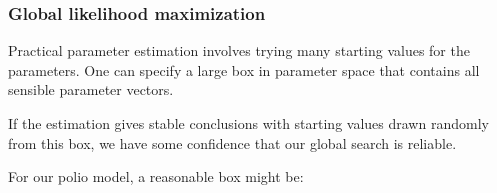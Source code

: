 \begin{frame}[fragile]

\frametitle{Global likelihood maximization}

\bi
\item 
Practical parameter estimation involves trying many starting values for the parameters. One can specify a large box in parameter space that contains all sensible parameter vectors.

\item If the estimation gives stable conclusions with starting values drawn randomly from this box, we have some confidence that our global search is reliable.

\item For our polio model, a reasonable box might be:
\ei

\begin{knitrout}\small
{}\color{fgcolor}\begin{kframe}
\begin{alltt}
 \hlkwb{<-} \hlstd{(}
  \hlstd{=}\hlstd{(}\hlopt{-}\hlstd{,}\hlstd{),} \hlstd{=}\hlstd{(}\hlopt{-}\hlstd{,}\hlstd{),}
  \hlstd{=}\hlstd{(}\hlopt{-}\hlstd{,}\hlstd{),} \hlstd{=}\hlstd{(}\hlopt{-}\hlstd{,}\hlstd{),}
  \hlstd{=}\hlstd{(}\hlopt{-}\hlstd{,}\hlstd{),} \hlstd{=}\hlstd{(}\hlopt{-}\hlstd{,}\hlstd{),}
  \hlstd{=}\hlstd{(}\hlstd{,}\hlstd{),} \hlstd{=}\hlstd{(}\hlstd{,}\hlstd{),} \hlstd{=}\hlstd{(}\hlstd{,}\hlstd{),}
  \hlstd{=}\hlstd{(}\hlstd{,}\hlstd{),} \hlstd{=}\hlstd{(}\hlstd{,}\hlstd{),}
  \hlstd{=}\hlstd{(}\hlstd{,}\hlstd{),} \hlstd{=}\hlstd{(}\hlstd{,}\hlstd{)}
\hlstd{)}
\end{alltt}
\end{kframe}
\end{knitrout}


\end{frame}


